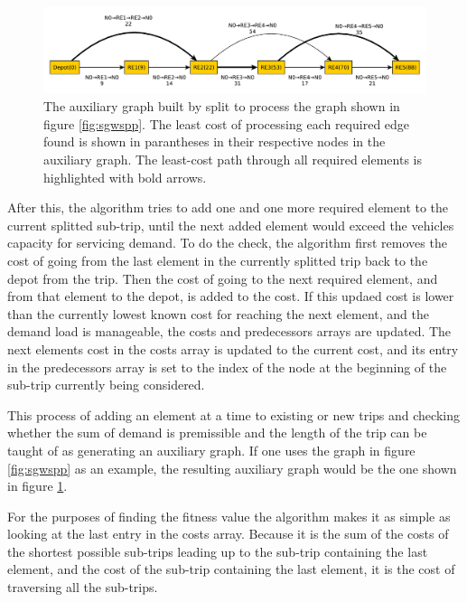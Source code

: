 \begin{figure}[thbp]
    \centerline{\includegraphics[width=\textwidth]{figures/SplitIllustrations/Split_AuxiliaryGraph.pdf}}
    \caption{The auxiliary graph built by split to process the graph shown in figure \ref{fig:sgwspp}. The least cost of processing each required edge found is shown in parantheses in their respective nodes in the auxiliary graph. The least-cost path through all required elements is highlighted with bold arrows.}
    \label{fig:sag}
\end{figure}

After this, the algorithm tries to add one and one more required element to the current splitted sub-trip, until the next added element would exceed the vehicles capacity for servicing demand. To do the check, the algorithm first removes the cost of going from the last element in the currently splitted trip back to the depot from the trip. Then the cost of going to the next required element, and from that element to the depot, is added to the cost. If this updaed cost is lower than the currently lowest known cost for reaching the next element, and the demand load is manageable, the costs and predecessors arrays are updated. The next elements cost in the costs array is updated to the current cost, and its entry in the predecessors array is set to the index of the node at the beginning of the sub-trip currently being considered.

This process of adding an element at a time to existing or new trips and checking whether the sum of demand is premissible and the length of the trip can be taught of as generating an auxiliary graph. If one uses the graph in figure \ref{fig:sgwspp} as an example, the resulting auxiliary graph would be the one shown in figure \ref{fig:sag}.

For the purposes of finding the fitness value the algorithm makes it as  simple as looking at the last entry in the costs array. Because it is the sum of the costs of the shortest possible sub-trips leading up to the sub-trip containing the last element, and the cost of the sub-trip containing the last element, it is the cost of traversing all the sub-trips.

